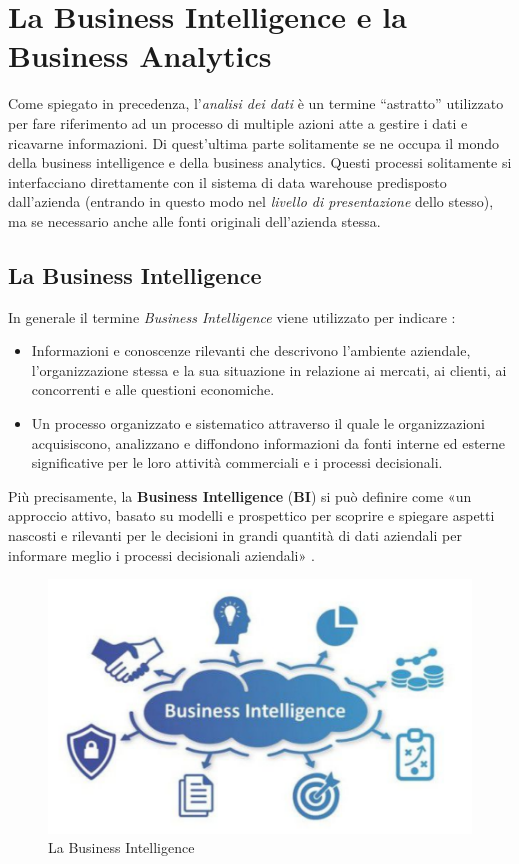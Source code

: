 \chapter{La Business Intelligence e la Business Analytics}
\label{ch:Business Intelligence and Analytics}

Come spiegato in precedenza, l'\textit{analisi dei dati} è un termine ``astratto'' utilizzato per fare riferimento ad un processo di multiple azioni atte a gestire i dati e ricavarne informazioni. Di quest'ultima parte solitamente se ne occupa il mondo della business intelligence e della business analytics. Questi processi solitamente si interfacciano direttamente con il sistema di data warehouse predisposto dall'azienda (entrando in questo modo nel \textit{livello di presentazione} dello stesso), ma se necessario anche alle fonti originali dell'azienda stessa.  

\section{La Business Intelligence}
In generale il termine \textit{Business Intelligence} viene utilizzato per indicare \cite{meauserement_of_bi}:

\begin{itemize}
    \item Informazioni e conoscenze rilevanti che descrivono l'ambiente aziendale, l'organizzazione stessa e la sua situazione in relazione ai mercati, ai clienti, ai concorrenti e alle questioni economiche.
    \item Un processo organizzato e sistematico attraverso il quale le organizzazioni acquisiscono, analizzano e diffondono informazioni da fonti interne ed esterne significative per le loro attività commerciali e i processi decisionali.
\end{itemize}

Più precisamente, la \textbf{Business Intelligence} (\textbf{BI}) si può definire come «un approccio attivo, basato su modelli e prospettico per scoprire e spiegare aspetti nascosti e rilevanti per le decisioni in grandi quantità di dati aziendali per informare meglio i processi decisionali aziendali» \cite{bi_strategic_intelligence}.

\begin{figure}[!h]
    \centering
    \includegraphics[width=0.75\linewidth]{figure//capitolo_3/Business Intelligence.pdf}
    \caption{La Business Intelligence}
    \label{fig:Business Intelligence}
\end{figure}

